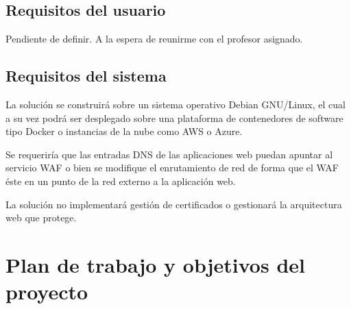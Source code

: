 \subsection{Requisitos del usuario}
\par Pendiente de definir. A la espera de reunirme con el profesor asignado.

\subsection{Requisitos del sistema}

\par La solución se construirá sobre un sistema operativo Debian GNU/Linux, el cual a su vez podrá ser desplegado
sobre una plataforma de contenedores de software tipo Docker o instancias de la nube como AWS o Azure.
\par Se requeriría que las entradas DNS de las aplicaciones web puedan apuntar al servicio WAF o bien se modifique el
enrutamiento de red de forma que el WAF éste en un punto de la red externo a la aplicación web.
\par La solución no implementará gestión de certificados o gestionará la arquitectura web que protege.

\section{Plan de trabajo y objetivos del proyecto}
